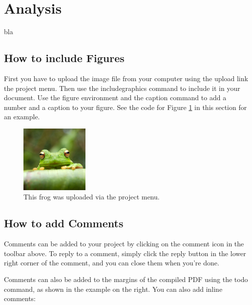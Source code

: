 \documentclass[a4paper]{article}
\begin{document}


\section{Analysis}

bla

\subsection{How to include Figures}

First you have to upload the image file from your computer using the upload link the project menu. Then use the includegraphics command to include it in your document. Use the figure environment and the caption command to add a number and a caption to your figure. See the code for Figure \ref{fig:frog} in this section for an example.

\begin{figure}
\centering
\includegraphics[width=0.3\textwidth]{frog.jpg}
\caption{\label{fig:frog}This frog was uploaded via the project menu.}
\end{figure}

\subsection{How to add Comments}

Comments can be added to your project by clicking on the comment icon in the toolbar above. %
%
%
To reply to a comment, simply click the reply button in the lower right corner of the comment, and you can close them when you're done.

Comments can also be added to the margins of the compiled PDF using the todo command, as shown in the example on the right. You can also add inline comments:
\end{document}
